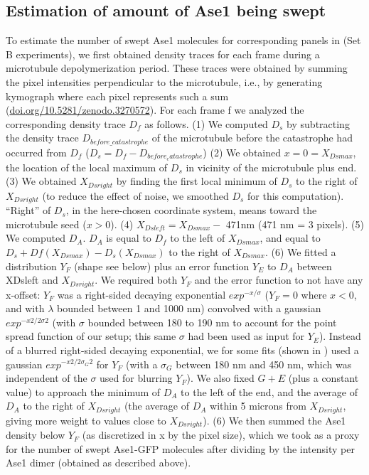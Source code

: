 \subsection{Estimation of amount of Ase1 being swept}
To estimate the number of swept Ase1 molecules for corresponding panels in  (Set B experiments), we first obtained density traces for each frame during a microtubule depolymerization period. These traces were obtained by summing the pixel intensities perpendicular to the microtubule, i.e., by generating kymograph where each pixel represents such a sum (\url{doi.org/10.5281/zenodo.3270572}). For each frame f we analyzed the corresponding density trace $D_f$ as follows. (1) We computed $D_s$ by subtracting the density trace $D_{before\_catastrophe}$ of the microtubule before the catastrophe had occurred from $D_f$ ($D_s = D_f - D_{before_catastrophe}$) (2) We obtained $x = 0 = X_{Dsmax}$, the location of the local maximum of $D_s$ in vicinity of the microtubule plus end. (3) We obtained $X_{Dsright}$ by finding the first local minimum of $D_s$ to the right of $X_{Dsright}$ (to reduce the effect of noise, we smoothed $D_s$ for this computation). “Right” of $D_s$, in the here-chosen coordinate system, means toward the microtubule seed ($x > 0$). (4) $X_{Dsleft} = X_{Dsmax} -$ 471nm (471 nm = 3 pixels). (5) We computed $D_A$. $D_A$ is equal to $D_f$ to the left of $X_{Dsmax}$, and equal to $D_s + Df(X_{Dsmax}) - D_s(X_{Dsmax})$ to the right of $X_{Dsmax}$. (6) We fitted a distribution $Y_F$ (shape see below) plus an error function $Y_E$ to $D_A$ between XDsleft and $X_{Dsright}$. We required both $Y_F$ and the error function to not have any x-offset: $Y_F$ was a right-sided decaying exponential $exp^{-x/\sigma}$ ($Y_F = 0$ where $x < 0$, and with $\lambda$ bounded between 1 and 1000 nm) convolved with a gaussian $exp^{-x2/2\sigma2}$ (with $\sigma$ bounded between 180 to 190 nm to account for the point spread function of our setup; this same $\sigma$ had been used as input for $Y_E$). Instead of a blurred right-sided decaying exponential, we for some fits (shown in ) used a gaussian $exp^{-x2/2\sigma_G2}$ for $Y_F$ (with a $\sigma_G$ between 180 nm and 450 nm, which was independent of the $\sigma$ used for blurring $Y_F$). We also fixed $G+E$ (plus a constant value) to approach the minimum of $D_A$ to the left of the end, and the average of $D_A$ to the right of $X_{Dsright}$ (the average of $D_A$ within 5 microns from $X_{Dsright}$, giving more weight to values close to $X_{Dsright}$). (6) We then summed the Ase1 density below $Y_F$ (as discretized in x by the pixel size), which we took as a proxy for the number of swept Ase1-GFP molecules after dividing by the intensity per Ase1 dimer (obtained as described above). 

